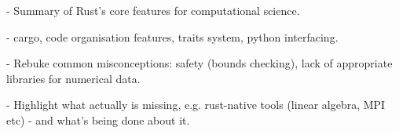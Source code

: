 - Summary of Rust's core features for computational science.

- cargo, code organisation features, traits system, python interfacing.

- Rebuke common misconceptions: safety (bounds checking), lack of appropriate libraries for numerical data.

- Highlight what actually is missing, e.g. rust-native tools (linear algebra, MPI etc) - and what's being done about it.

